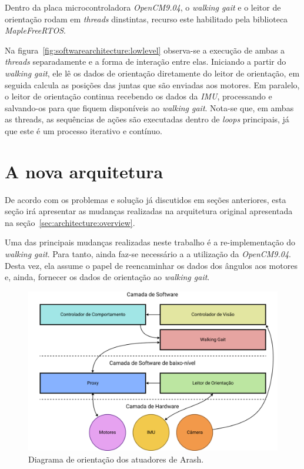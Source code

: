 Dentro da placa microcontroladora \textit{OpenCM9.04}, o \textit{walking gait} e o leitor de orientação rodam em \textit{threads} dinstintas, recurso este habilitado pela biblioteca \textit{MapleFreeRTOS}.

Na figura~\ref{fig:softwarearchitecture:lowlevel} observa-se a execução de ambas a \textit{threads} separadamente e a forma de interação entre elas. Iniciando a partir do \textit{walking gait}, ele lê os dados de orientação diretamente do leitor de orientação, em seguida calcula as posições das juntas que são enviadas aos motores. Em paralelo, o leitor de orientação continua recebendo os dados da \textit{IMU}, processando e salvando-os para que fiquem disponíveis ao \textit{walking gait}. Nota-se que, em ambas as threads, as sequências de ações são executadas dentro de \textit{loops} principais, já que este é um processo iterativo e contínuo.

\section{A nova arquitetura}

De acordo com os problemas e solução já discutidos em seções anteriores, esta seção irá apresentar as mudanças realizadas na arquitetura original apresentada na seção~\ref{sec:architecture:overview}.

Uma das principais mudanças realizadas neste trabalho é a re-implementação do \textit{walking gait}. Para tanto, ainda faz-se necessário a a utilização da \textit{OpenCM9.04}. Desta vez, ela assume o papel de reencaminhar os dados dos ângulos aos motores e, ainda, fornecer os dados de orientação ao \textit{walking gait}.

\begin{figure}[h!]
	\centering
	\includegraphics[scale=1]{imagens/svg/softwarearchitecture-newproposal}
	\caption{Diagrama de orientação dos atuadores de Arash.}
	\label{fig:softwarearchitecture:newproposal}
\end{figure}

